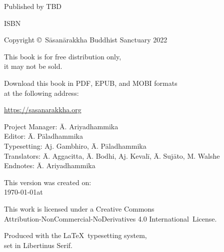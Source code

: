 \cleartoverso
\thispagestyle{empty}

\vspace*{-\baselineskip}

{%

\fontsize{10}{16}\selectfont
\centering
\setlength{\parindent}{0pt}%

\thesubtitle

\vspace{0.5cm}

Published by TBD

ISBN \theISBN

Copyright \copyright\ Sāsanārakkha Buddhist Sanctuary 2022

\vspace{0.5cm}

This book is for free distribution only,\\
it may not be sold.

\vspace{0.5cm}

Download this book in PDF, EPUB, and MOBI formats\\
at the following address:

\href{https://sasanarakkha.org/}{https://sasanarakkha.org}

\vspace{0.5cm}

Project Manager: Ā. Ariyadhammika\\
Editor: Ā. Pāladhammika\\
Typesetting: Aj. Gambhiro, Ā. Pāladhammika\\
Translators: Ā. Aggacitta, Ā. Bodhi, Aj. Kevalī, Ā. Sujāto, M. Walshe\\
Endnotes: Ā. Ariyadhammika

\vspace{0.5cm}

This version was created on:\\
\today \space at \currenttime

\vspace{0.5cm}

This work is licensed under a Creative Commons\\
Attribution-NonCommercial-NoDerivatives 4.0 International~License.

Produced with the \LaTeX\ typesetting system,\\
set in Libertinus Serif.

\theEditionInfo

}
